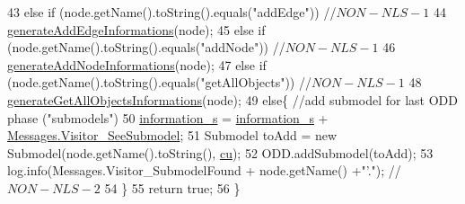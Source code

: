 \begin{DoxyCode}
43         \textcolor{keywordflow}{else} \textcolor{keywordflow}{if} (node.getName().toString().equals(\textcolor{stringliteral}{"addEdge"})) \textcolor{comment}{//$NON-NLS-1$}
44             \hyperlink{classit_1_1isislab_1_1masonassisteddocumentation_1_1visitor_1_1_start_step_method_visitor_a11cd1a31034690b4967546ff9250ead6}{generateAddEdgeInformations}(node);
45         \textcolor{keywordflow}{else} \textcolor{keywordflow}{if} (node.getName().toString().equals(\textcolor{stringliteral}{"addNode"})) \textcolor{comment}{//$NON-NLS-1$}
46             \hyperlink{classit_1_1isislab_1_1masonassisteddocumentation_1_1visitor_1_1_start_step_method_visitor_ae25b311d9d104c6c8bf1a4842128ccfb}{generateAddNodeInformations}(node);
47         \textcolor{keywordflow}{else} \textcolor{keywordflow}{if} (node.getName().toString().equals(\textcolor{stringliteral}{"getAllObjects"})) \textcolor{comment}{//$NON-NLS-1$}
48             \hyperlink{classit_1_1isislab_1_1masonassisteddocumentation_1_1visitor_1_1_start_step_method_visitor_aaac88492e920fed7167b806a778d5dbd}{generateGetAllObjectsInformations}(node);
49         \textcolor{keywordflow}{else}\{   \textcolor{comment}{//add submodel for last ODD phase ("submodels")}
50             \hyperlink{classit_1_1isislab_1_1masonassisteddocumentation_1_1visitor_1_1_code_visitor_a628ab846d2f4de647f171060ebe73774}{information\_s} = \hyperlink{classit_1_1isislab_1_1masonassisteddocumentation_1_1visitor_1_1_code_visitor_a628ab846d2f4de647f171060ebe73774}{information\_s} + 
      \hyperlink{classit_1_1isislab_1_1masonassisteddocumentation_1_1visitor_1_1_messages_ae783619de1490884585d747b9fd0a4a4}{Messages.Visitor\_SeeSubmodel};
51             Submodel toAdd = \textcolor{keyword}{new} Submodel(node.getName().toString(), \hyperlink{classit_1_1isislab_1_1masonassisteddocumentation_1_1visitor_1_1_start_step_method_visitor_a0bfe5ac0a34decfd8a1cc74dab7afea4}{cu});
52             ODD.addSubmodel(toAdd);
53             log.info(Messages.Visitor\_SubmodelFound + node.getName() +\textcolor{stringliteral}{"'."});             \textcolor{comment}{//$NON-NLS-2$}
54         \}
55         \textcolor{keywordflow}{return} \textcolor{keyword}{true};
56     \}
\end{DoxyCode}


